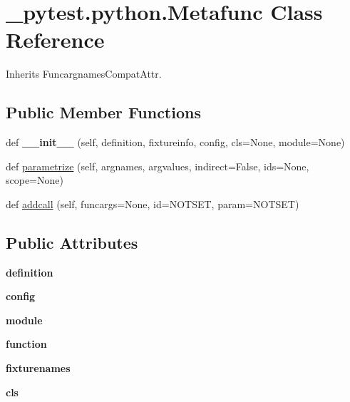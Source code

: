 \hypertarget{class__pytest_1_1python_1_1_metafunc}{}\section{\+\_\+pytest.\+python.\+Metafunc Class Reference}
\label{class__pytest_1_1python_1_1_metafunc}


Inherits Funcargnames\+Compat\+Attr.

\subsection*{Public Member Functions}
\begin{DoxyCompactItemize}
\item 
\mbox{\label{class__pytest_1_1python_1_1_metafunc_a4d0cefafd8b6bad5d68098f07b7ac58a}} 
def {\bfseries \+\_\+\+\_\+init\+\_\+\+\_\+} (self, definition, fixtureinfo, config, cls=None, module=None)
\item 
def \hyperlink{class__pytest_1_1python_1_1_metafunc_abc41169b0a1db224380e1f7aaa4e5eaa}{parametrize} (self, argnames, argvalues, indirect=False, ids=None, scope=None)
\item 
def \hyperlink{class__pytest_1_1python_1_1_metafunc_adb6df445cadf2192144df7e44b66dd3b}{addcall} (self, funcargs=None, id=N\+O\+T\+S\+ET, param=N\+O\+T\+S\+ET)
\end{DoxyCompactItemize}
\subsection*{Public Attributes}
\begin{DoxyCompactItemize}
\item 
\mbox{\label{class__pytest_1_1python_1_1_metafunc_aa30a1f1d5d6e2410a039b1a42c154aa8}} 
{\bfseries definition}
\item 
\mbox{\label{class__pytest_1_1python_1_1_metafunc_a646f937ccd4b32c3f775d0485b8e5191}} 
{\bfseries config}
\item 
\mbox{\label{class__pytest_1_1python_1_1_metafunc_adc6c09caf09134f1e1b12593ad86805d}} 
{\bfseries module}
\item 
\mbox{\label{class__pytest_1_1python_1_1_metafunc_a3e8ccf8ff90acbc2dba12de5795c0f79}} 
{\bfseries function}
\item 
\mbox{\label{class__pytest_1_1python_1_1_metafunc_acafc9ad599a20ddee090b1f62d53bf0a}} 
{\bfseries fixturenames}
\item 
\mbox{\label{class__pytest_1_1python_1_1_metafunc_a1c6ac6e568d78b4d9d743246c8fda072}} 
{\bfseries cls}
\end{DoxyCompactItemize}


